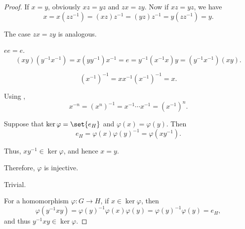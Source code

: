 \begin{proof}
   If \( x = y \), obviously \( xz = yz \) and \( zx = zy \). Now if \( xz = yz \), we have
  \begin{equation*}
    x = x(zz^{-1}) = (xz)z^{-1} = (yz)z^{-1} = y(zz^{-1}) = y.
  \end{equation*}

  The case \( zx = zy \) is analogous.

   \( ee = e \).
  \begin{equation*}
    (xy) (y^{-1} x^{-1})
    =
    x (y y^{-1}) x^{-1}
    =
    e
    =
    y^{-1} (x^{-1} x) y
    =
    (y^{-1} x^{-1}) (xy).
  \end{equation*}

  \begin{equation*}
    (x^{-1})^{-1}
    =
    x x^{-1} (x^{-1})^{-1}
    =
    x.
  \end{equation*}

   Using ,
  \begin{equation*}
    x^{-n}
    =
    (x^n)^{-1}
    =
    x^{-1} \cdots x^{-1}
    =
    (x^{-1})^n.
  \end{equation*}

   Suppose that \( \ker \varphi = \set{ e_H } \) and \( \varphi(x) = \varphi(y) \). Then
  \begin{equation*}
    e_H = \varphi(x) \varphi(y)^{-1} = \varphi(x y^{-1}).
  \end{equation*}

  Thus, \( x y^{-1} \in \ker \varphi \), and hence \( x = y \).

  Therefore, \( \varphi \) is injective.

   Trivial.

   For a homomorphism \( \varphi: G \to H \), if \( x \in \ker \varphi \), then
  \begin{equation*}
    \varphi(y^{-1} x y) = \varphi(y)^{-1} \varphi(x) \varphi(y) = \varphi(y)^{-1} \varphi(y) = e_H,
  \end{equation*}
  and thus \( y^{-1} x y \in \ker \varphi \).
\end{proof}

